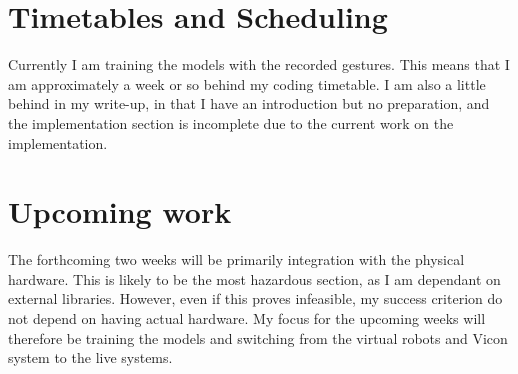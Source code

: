 \section*{Timetables and Scheduling} Currently I am training the models with the recorded gestures. This means that I am approximately a week or so behind my coding timetable. I am also a little behind in my write-up, in that I have an introduction but no preparation, and the implementation section is incomplete due to the current work on the implementation.

\section*{Upcoming work} The forthcoming two weeks will be primarily integration with the physical hardware. This is likely to be the most hazardous section, as I am dependant on external libraries. However, even if this proves infeasible, my success criterion do not depend on having actual hardware. My focus for the upcoming weeks will therefore be training the models and switching from the virtual robots and Vicon system to the live systems.

